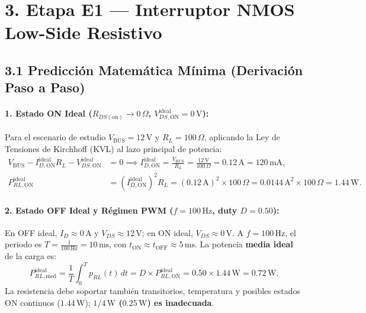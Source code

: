 \documentclass[10pt, a4paper, landscape]{article}
\begin{document}
\newpage
\section*{3. Etapa E1 — Interruptor NMOS Low-Side Resistivo}

\subsection*{3.1 Predicción Matemática Mínima (Derivación Paso a Paso)}

\paragraph{1. Estado ON Ideal ($R_{DS(\text{on})} \rightarrow 0\,\Omega$, $V_{DS,\text{ON}}^{\text{ideal}} = 0\,\text{V}$):}
Para el escenario de estudio $V_{\text{BUS}} = 12\,\text{V}$ y $R_L = 100\,\Omega$, aplicando la Ley de Tensiones de Kirchhoff (KVL) al lazo principal de potencia:
\begin{align}
    V_{\text{BUS}} - I_{D,\text{ON}}^{\text{ideal}} R_L - V_{DS,\text{ON}}^{\text{ideal}} &= 0 \implies I_{D,\text{ON}}^{\text{ideal}} = \frac{V_{\text{BUS}}}{R_L} = \frac{12\,\text{V}}{100\,\Omega} = 0.12\,\text{A} = 120\,\text{mA}, \\
    P_{RL,\text{ON}}^{\text{ideal}} &= \left(I_{D,\text{ON}}^{\text{ideal}}\right)^2 R_L = (0.12\,\text{A})^2 \times 100\,\Omega = 0.0144\,\text{A}^2 \times 100\,\Omega = 1.44\,\text{W}.
\end{align}

\paragraph{2. Estado OFF Ideal y Régimen PWM ($f = 100\,\text{Hz}$, duty $D = 0.50$):}
En OFF ideal, $I_D \approx 0\,\text{A}$ y $V_{DS} \approx 12\,\text{V}$; en ON ideal, $V_{DS} \approx 0\,\text{V}$. A $f = 100\,\text{Hz}$, el periodo es $T = \frac{1}{100\,\text{Hz}} = 10\,\text{ms}$, con $t_{\text{ON}} \approx t_{\text{OFF}} \approx 5\,\text{ms}$. La potencia \textbf{media ideal} de la carga es:
\begin{equation}
    P_{RL,\text{med}}^{\text{ideal}} = \frac{1}{T}\int_0^T p_{RL}(t)\,dt = D \times P_{RL,\text{ON}}^{\text{ideal}} = 0.50 \times 1.44\,\text{W} = 0.72\,\text{W}.
\end{equation}
La resistencia debe soportar también transitorios, temperatura y posibles estados ON continuos ($1.44\,\text{W}$); \textbf{$1/4\,\text{W}$ ($0.25\,\text{W}$) es inadecuada}.
\end{document}

